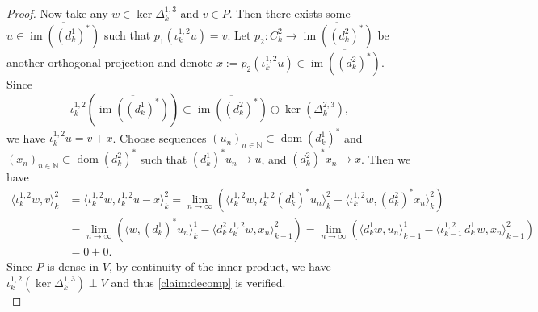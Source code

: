\documentclass[11pt]{article}
\theoremstyle{definition}
\theoremstyle{remark}
\DeclareMathOperator\dom{dom}
\DeclareMathOperator{\im}{im}
\newcommand{\N}{\mathbb{N}}
\begin{document}
\begin{proof}
        Now take any $w \in \ker \Delta_k^{1,3}$ and $v \in P$. Then there exists some $u\in \overline{\im((d_k^1)^*)}$ such that $p_1(\iota^{1,2}_ku)=v$. Let $p_2:C^2_k\to \overline{\im((d_k^2)^*)}$ be another orthogonal projection and denote $x:=p_2(\iota^{1,2}_ku)\in \overline{\im((d_k^2)^*)}$. Since
        $$\iota_k^{1,2} \left(\overline{\im((d_k^1)^*)}\right) \subset \overline{\im((d_k^2)^*)} \oplus \ker(\Delta_k^{2,3}),$$
         we have $\iota_k^{1,2} u=v+x$. Choose sequences $(u_n)_{n \in \N} \subset \dom(d_k^1)^*$ and $(x_n)_{n \in \N} \subset \dom(d_k^2)^*$ such that $(d^1_k)^*u_n\to u$, and $(d^2_k)^*x_n\to x$. Then we have
        \begin{align*}
            \langle \iota_k^{1,2} w,v \rangle_k^2 &= \langle \iota_k^{1,2} w,\iota_k^{1,2}u-x \rangle_k^2 = \lim_{n \rightarrow \infty} (\langle \iota_k^{1,2} w,\iota_k^{1,2} (d_k^1)^*u_n \rangle_k^2 - \langle \iota_k^{1,2} w,(d_k^2)^*x_n \rangle_k^2)\\
            &=\lim_{n \rightarrow \infty} (\langle w,(d_k^1)^*u_n \rangle_k^1 - \langle d_k^2 \, \iota_k^{1,2} w,x_n \rangle_{k-1}^2)=\lim_{n \rightarrow \infty} (\langle d_k^1 w,u_n \rangle_{k-1}^1 - \langle \iota_{k-1}^{1,2} \, d_k^1 \, w,x_n \rangle_{k-1}^2)\\
            &=0+0.
        \end{align*}
        Since $P$ is dense in $V$, by continuity of the inner product, we have $\iota_k^{1,2} (\ker \Delta_k^{1,3}) \perp V$ and thus \cref{claim:decomp} is  verified.\\
        

\end{proof}
\end{document}
